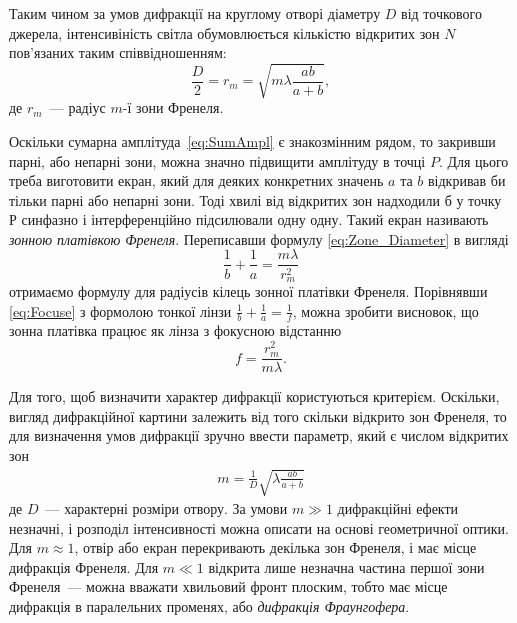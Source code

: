 Таким чином за умов дифракції на круглому отворі діаметру $D$ від точкового джерела, інтенсивіність світла обумовлюється кількістю відкритих зон $N$ пов'язаних таким співвідношенням:
\begin{equation}\label{eq:Zone_Diameter}
    \frac{D}{2}=r_{m}=\sqrt{m\lambda\frac{ab}{a+b}},
\end{equation}
де $r_{m}$~--- радіус $m$-ї зони Френеля. 

 Оскільки сумарна амплітуда~\eqref{eq:SumAmpl} є знакозмінним рядом, то закривши парні, або непарні зони, можна значно підвищити амплітуду в точці $P$. Для цього треба виготовити екран, який для деяких конкретних значень $a$ та $b$ відкривав би тільки парні або непарні зони. Тоді хвилі від відкритих зон надходили б у точку $Р$ синфазно і інтерференційно підсилювали одну одну. Такий екран називають \emph{зонною платівкою Френеля}. Переписавши формулу \eqref{eq:Zone_Diameter} в вигляді
\begin{equation}\label{eq:Focuse}
    \frac1b+\frac1a=\frac{m\lambda}{r_{m}^{2}}
\end{equation}
    отримаємо формулу для радіусів кілець зонної платівки Френеля. Порівнявши \eqref{eq:Focuse} з формолою тонкої лінзи $\frac1b + \frac1a  = \frac1f$, можна зробити висновок, що зонна платівка працює як лінза з фокусною відстанню
\begin{equation}
    f=\frac{r^{2}_{m}}{m\lambda}.
\end{equation}

Для того, щоб визначити характер дифракції користуються критерієм. Оскільки, вигляд дифракційної  картини залежить від того скільки відкрито зон Френеля, то для визначення умов дифракції зручно ввести параметр, який є числом відкритих зон
\begin{eqnarray}
    m =\frac1D{\sqrt{\lambda\frac{ab}{a + b}}}
\end{eqnarray}
    де $D$~--- характерні розміри отвору.  За умови $m\gg1$ дифракційні ефекти незначні, і розподіл інтенсивності можна описати на основі  геометричної оптики. Для $m\approx1$, отвір або екран перекривають декілька зон Френеля, і має місце дифракція Френеля. Для $m\ll1$ відкрита лише незначна частина першої зони Френеля~--- можна вважати хвильовий фронт плоским, тобто має місце дифракція в  паралельних променях, або \emph{дифракція Фраунгофера}.


